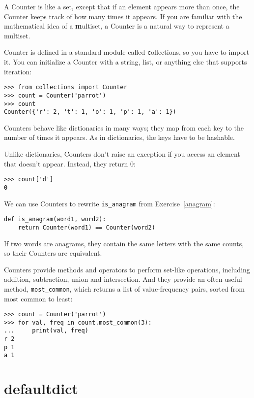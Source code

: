 \documentclass[
DIV=11,
fontsize=12,
twoside,
headinclude=false,
titlepage=firstiscover,
abstract=true,
headsepline=true,
footsepline=true,
chapterprefix=true, %
headings=big,
bibliography=totoc,%
captions=tableheading
]{scrbook}
\theoremstyle{definition}
\begin{document}
A Counter is like a set, except that if an element appears more
than once, the Counter keeps track of how many times it appears.
If you are familiar with the mathematical idea of a {\textbf multiset},
a Counter is a natural way to represent a multiset.

Counter is defined in a standard module called {\texttt collections},
so you have to import it.  You can initialize a Counter with a string,
list, or anything else that supports iteration:

\begin{lstlisting}
>>> from collections import Counter
>>> count = Counter('parrot')
>>> count
Counter({'r': 2, 't': 1, 'o': 1, 'p': 1, 'a': 1})
\end{lstlisting}

Counters behave like dictionaries in many ways; they map from each
key to the number of times it appears.  As in dictionaries,
the keys have to be hashable.

Unlike dictionaries, Counters don't raise an exception if you access
an element that doesn't appear.  Instead, they return 0:

\begin{lstlisting}
>>> count['d']
0
\end{lstlisting}

We can use Counters to rewrite \verb"is_anagram" from
Exercise~\ref{anagram}:

\begin{lstlisting}
def is_anagram(word1, word2):
    return Counter(word1) == Counter(word2)
\end{lstlisting}

If two words are anagrams, they contain the same letters with the same
counts, so their Counters are equivalent.

Counters provide methods and operators to perform set-like operations,
including addition, subtraction, union and intersection.  And
they provide an often-useful method, \verb"most_common", which
returns a list of value-frequency pairs, sorted from most common to
least:

\begin{lstlisting}
>>> count = Counter('parrot')
>>> for val, freq in count.most_common(3):
...     print(val, freq)
r 2
p 1
a 1
\end{lstlisting}


\section{defaultdict}
\end{document}
